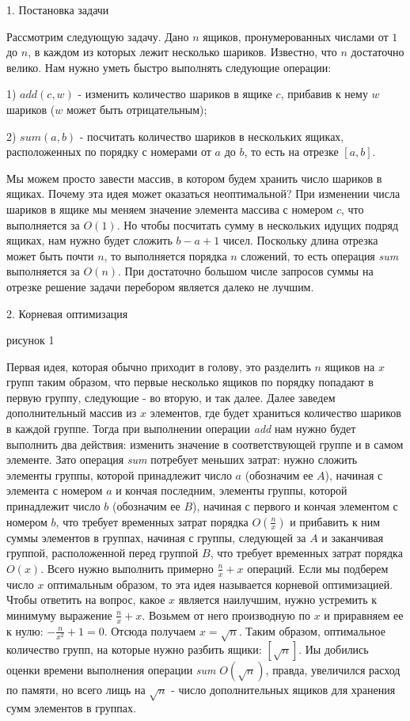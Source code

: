 \documentclass[11pt,a4paper,oneside]{article}
\begin{document}
1. Постановка задачи

Рассмотрим следующую задачу. Дано $n$ ящиков, пронумерованных числами от $1$ 
до $n$, в каждом из которых лежит несколько шариков. Известно, что $n$ 
достаточно велико. Нам нужно уметь быстро выполнять следующие операции: 

1) $add(c, w)$ - изменить количество шариков в ящике $c$, прибавив к нему $w$ шариков 
($w$ может быть отрицательным); 

2) $sum(a, b)$ - посчитать количество шариков в нескольких ящиках, расположенных по порядку с номерами от $a$ 
до $b$, то есть на отрезке $[a,b]$.

Мы можем просто завести массив, в котором будем хранить число шариков в ящиках. 
Почему эта идея может оказаться неоптимальной? 
При изменении числа шариков в ящике мы меняем значение элемента массива с номером $c$, что выполняется 
за $O(1)$. Но чтобы посчитать сумму в нескольких идущих подряд ящиках, нам нужно будет сложить 
$b - a + 1$ чисел. Поскольку длина отрезка может быть почти $n$, то выполняется порядка $n$ сложений, то есть
операция {\it sum} выполняется за $O(n)$. При достаточно большом числе запросов суммы на отрезке решение 
задачи перебором является далеко не лучшим.

2. Корневая оптимизация

рисунок 1

Первая идея, которая обычно приходит в голову, это разделить $n$ ящиков на $x$ 
групп таким образом, что первые несколько ящиков по порядку попадают в первую 
группу, следующие - во вторую, и так далее. Далее заведем дополнительный массив 
из $x$ элементов, где будет храниться количество шариков в каждой группе. Тогда 
при выполнении операции {\it add} нам нужно будет выполнить два действия: 
изменить значение в соответствующей группе и в самом элементе. Зато операция 
{\it sum} потребует меньших затрат: нужно сложить элементы группы, которой 
принадлежит число $a$ (обозначим ее $A$), начиная с элемента с номером $a$ и 
кончая последним, элементы группы, которой принадлежит число $b$ (обозначим ее 
$B$), начиная с первого и кончая элементом с номером $b$, что требует временных 
затрат порядка $O(\frac{n}{x})$ и прибавить к ним суммы элементов в группах, 
начиная с группы, следующей за $A$ и заканчивая группой, расположенной перед 
группой $B$, что требует временных затрат порядка $O(x)$. Всего нужно выполнить 
примерно $\frac{n}{x} + x$ операций. Если мы подберем число $x$ оптимальным 
образом, то эта идея называется корневой оптимизацией. Чтобы ответить на вопрос, 
какое $x$ является наилучшим, нужно устремить к минимуму выражение 
$\frac{n}{x} + x$. Возьмем от него производную по $x$ и приравняем ее к нулю: 
$-\frac{n}{x^{2}}+1=0$. Отсюда получаем $x=\sqrt{n}$. Таким образом, 
оптимальное количество групп, на которые нужно разбить ящики: $[\sqrt{n}]$. 
Иы добились оценки времени выполнения операции {\it sum} $O(\sqrt{n})$, правда, 
увеличился расход по памяти, но всего лищь на $\sqrt{n}$ - число дополнительных
 ящиков для хранения сумм элементов в группах.
\end{document}
